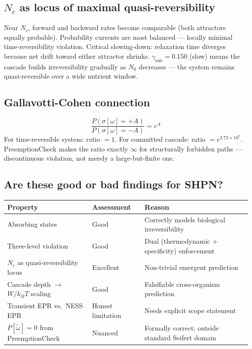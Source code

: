 \documentclass[11pt,a4paper]{article}
\begin{document}
\subsection*{$N_c$ as locus of maximal quasi-reversibility}

Near $N_c$, forward and backward rates become comparable (both attractors
equally probable).
Probability currents are most balanced --- locally minimal
time-reversibility violation.
Critical slowing-down: relaxation time diverges because net drift toward
either attractor shrinks.
$\gamma_{\mathrm{sub}} = 0.150$ (slow) means the cascade builds
irreversibility gradually as $N_0$ decreases --- the system remains
quasi-reversible over a wide nutrient window.

\subsection*{Gallavotti-Cohen connection}

\[
  \frac{P(\sigma[\omega] = +A)}{P(\sigma[\omega] = -A)} = e^A
\]
For time-reversible system: ratio $= 1$.
For committed cascade: ratio $= e^{3.72\times10^7}$.
PreemptionCheck makes the ratio exactly $\infty$ for structurally
forbidden paths --- discontinuous violation, not merely a large-but-finite
one.

\subsection*{Are these good or bad findings for SHPN?}

\begin{center}
\begin{tabular}{p{5.5cm}ll}
\toprule
Property & Assessment & Reason \\
\midrule
Absorbing states & Good & Correctly models biological irreversibility \\
Three-level violation & Good & Dual (thermodynamic + specificity) enforcement \\
$N_c$ as quasi-reversibility locus & Excellent & Non-trivial emergent prediction \\
Cascade depth $\to$ $W/k_BT$ scaling & Good & Falsifiable cross-organism prediction \\
Transient EPR vs.\ NESS EPR & Honest limitation & Needs explicit scope statement \\
$P[\tilde\omega] = 0$ from PreemptionCheck & Nuanced &
  Formally correct; outside standard Seifert domain \\
\bottomrule
\end{tabular}
\end{center}
\end{document}
